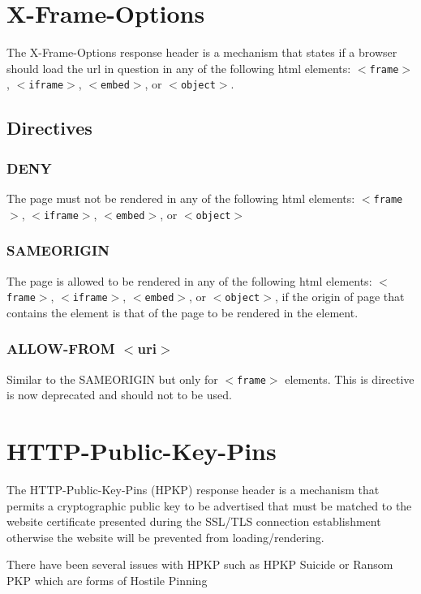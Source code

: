 \documentclass{mscreport}
\begin{document}
\newpage

\section{X-Frame-Options}
\label{section:xfo}

The X-Frame-Options response header is a mechanism that states if a browser should load the url in question in any of the following html elements: \texttt{$<$frame$>$}, \texttt{$<$iframe$>$}, \texttt{$<$embed$>$}, or \texttt{$<$object$>$}.

\subsection{Directives}
\subsubsection{DENY}
The page must not be rendered in any of the following html elements: \texttt{$<$frame$>$}, \texttt{$<$iframe$>$}, \texttt{$<$embed$>$}, or \texttt{$<$object$>$}

\subsubsection{SAMEORIGIN}
The page is allowed to be rendered in any of the following html elements: \texttt{$<$frame$>$}, \texttt{$<$iframe$>$}, \texttt{$<$embed$>$}, or \texttt{$<$object$>$}, if the origin of page that contains the element is that of the page to be rendered in the element.

\subsubsection{ALLOW-FROM $<$uri$>$}
Similar to the SAMEORIGIN but only for \texttt{$<$frame$>$} elements. This is directive is now deprecated and should not to be used.

\section{HTTP-Public-Key-Pins}
\label{section:hpkp}

The HTTP-Public-Key-Pins (HPKP) response header is a mechanism that permits a cryptographic public key to be advertised that must be matched to the website certificate presented during the SSL/TLS connection establishment otherwise the website will be prevented from loading/rendering.

\vspace{0.3cm} \noindent
There have been several issues with HPKP such as HPKP Suicide \cite{Chen2018-ft,Chuat2021-nf} or Ransom PKP \cite{Chuat2021-nf} which are forms of Hostile Pinning \cite{Evans2018-mi}
\end{document}
